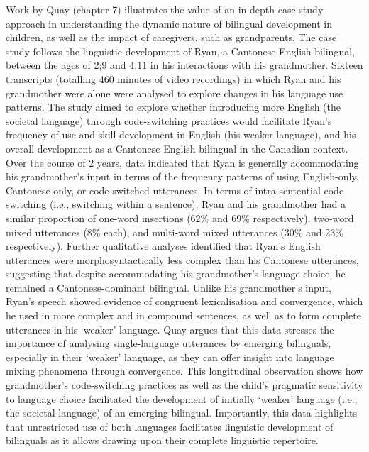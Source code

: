 \documentclass[output=paper]{langscibook}
\begin{document}
Work by Quay (chapter 7) illustrates the value of an in-depth case study approach in understanding the dynamic nature of bilingual development in children, as well as the impact of caregivers, such as grandparents. The case study follows the linguistic development of Ryan, a Cantonese-English bilingual, between the ages of 2;9 and 4;11 in his interactions with his grandmother. Sixteen transcripts (totalling 460 minutes of video recordings) in which Ryan and his grandmother were alone were analysed to explore changes in his language use patterns. The study aimed to explore whether introducing more English (the societal language) through code-switching practices would facilitate Ryan’s frequency of use and skill development in English (his weaker language), and his overall development as a Cantonese-English bilingual in the Canadian context. Over the course of 2 years, data indicated that Ryan is generally accommodating his grandmother’s input in terms of the frequency patterns of using English-only, Cantonese-only, or code-switched utterances. In terms of intra-sentential code-switching (i.e., switching within a sentence), Ryan and his grandmother had a similar proportion of one-word insertions (62\% and 69\% respectively), two-word mixed utterances (8\% each), and multi-word mixed utterances (30\% and 23\% respectively). Further qualitative analyses identified that Ryan’s English utterances were morphosyntactically less complex than his Cantonese utterances, suggesting that despite accommodating his grandmother’s language choice, he remained a Cantonese-dominant bilingual. Unlike his grandmother’s input, Ryan’s speech showed evidence of congruent lexicalisation and convergence, which he used in more complex and in compound sentences, as well as to form complete utterances in his ‘weaker’ language. Quay argues that this data stresses the importance of analysing single-language utterances by emerging bilinguals, especially in their ‘weaker’ language, as they can offer insight into language mixing phenomena through convergence. This longitudinal observation shows how grandmother’s code-switching practices as well as the child’s pragmatic sensitivity to language choice facilitated the development of initially ‘weaker’ language (i.e., the societal language) of an emerging bilingual. Importantly, this data highlights that unrestricted use of both languages facilitates linguistic development of bilinguals as it allows drawing upon their complete linguistic repertoire. 
\end{document}
